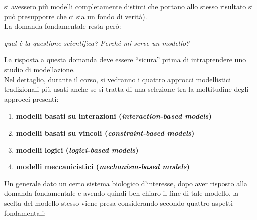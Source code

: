 \documentclass[a4paper,12pt, oneside]{book}
\begin{document}
si avessero più modelli completamente distinti che portano allo stesso risultato
si può presupporre che ci sia un fondo di verità). \\
La domanda fondamentale resta però:
\begin{center}
  \textit{qual è la questione scientifica? Perché mi serve un modello?}
\end{center}
La risposta a questa domanda deve essere ``sicura'' prima di intraprendere uno
studio di modellazione.\\
Nel dettaglio, durante il corso, si vedranno i quattro approcci modellistici
tradizionali più usati anche se si tratta di una selezione tra la moltitudine
degli approcci presenti:
\begin{enumerate}
  \item \textbf{modelli basati su interazioni (\textit{interaction-based
      models})}
  \item \textbf{modelli basati su vincoli (\textit{constraint-based
      models})}
  \item \textbf{modelli logici (\textit{logici-based models})}
  \item \textbf{modelli meccanicistici (\textit{mechanism-based models})}
\end{enumerate}
Un generale dato un certo sistema biologico d'interesse, dopo aver risposto alla
domanda fondamentale e avendo quindi ben chiaro il fine di tale modello, la
scelta del modello stesso viene presa considerando secondo quattro aspetti
fondamentali:
\end{document}
